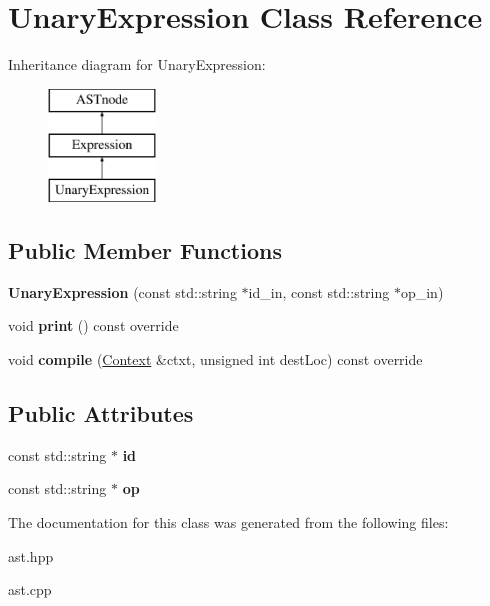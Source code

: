 \hypertarget{class_unary_expression}{}\section{Unary\+Expression Class Reference}
\label{class_unary_expression}
Inheritance diagram for Unary\+Expression\+:\begin{figure}[H]
\begin{center}
\leavevmode
\includegraphics[height=3.000000cm]{class_unary_expression}
\end{center}
\end{figure}
\subsection*{Public Member Functions}
\begin{DoxyCompactItemize}
\item 
\mbox{\label{class_unary_expression_aa28ae8e45294dbc001a2130cc034d3dd}} 
{\bfseries Unary\+Expression} (const std\+::string $\ast$id\+\_\+in, const std\+::string $\ast$op\+\_\+in)
\item 
\mbox{\label{class_unary_expression_afa622c4aa468c5b9b109ce0b56208fcb}} 
void {\bfseries print} () const override
\item 
\mbox{\label{class_unary_expression_af037b3b99f641a8594b5071a7ec23327}} 
void {\bfseries compile} (\hyperlink{class_context}{Context} \&ctxt, unsigned int dest\+Loc) const override
\end{DoxyCompactItemize}
\subsection*{Public Attributes}
\begin{DoxyCompactItemize}
\item 
\mbox{\label{class_unary_expression_a3d0c1fd7b88bdcaafa8621fbc16d13f8}} 
const std\+::string $\ast$ {\bfseries id}
\item 
\mbox{\label{class_unary_expression_a10f6d008a699e30220e3778146e4ba22}} 
const std\+::string $\ast$ {\bfseries op}
\end{DoxyCompactItemize}


The documentation for this class was generated from the following files\+:\begin{DoxyCompactItemize}
\item 
ast.\+hpp\item 
ast.\+cpp\end{DoxyCompactItemize}

